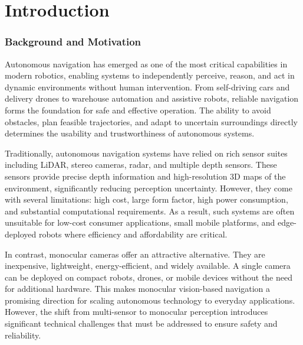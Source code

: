 \documentclass[12pt,oneside]{book}
\makeatletter
\renewcommand{\thefigure}{\Roman{figure}}
\renewcommand{\tablename}{TABLE}
\renewcommand{\thetable}{\Roman{table}}
\renewcommand{\fnum@table}{\tablename~\thetable}
\makeatother
\begin{document}
\renewcommand{\listtablename}{LIST OF TABLES}
\renewcommand{\tablename}{TABLE}
\renewcommand{\thetable}{\Roman{table}}
\makeatletter
\renewcommand{\fnum@table}{\tablename~\thefigure}
\makeatother

\listoftables
\clearpage

\chapter{Introduction}

\let\oldsection\section
\renewcommand{\section}[1]{\oldsection*{#1}}

\subsection{Background and Motivation}
Autonomous navigation has emerged as one of the most critical capabilities in modern robotics, enabling systems to independently perceive, reason, and act in dynamic environments without human intervention. From self-driving cars and delivery drones to warehouse automation and assistive robots, reliable navigation forms the foundation for safe and effective operation. The ability to avoid obstacles, plan feasible trajectories, and adapt to uncertain surroundings directly determines the usability and trustworthiness of autonomous systems.

Traditionally, autonomous navigation systems have relied on rich sensor suites including LiDAR, stereo cameras, radar, and multiple depth sensors. These sensors provide precise depth information and high-resolution 3D maps of the environment, significantly reducing perception uncertainty. However, they come with several limitations: high cost, large form factor, high power consumption, and substantial computational requirements. As a result, such systems are often unsuitable for low-cost consumer applications, small mobile platforms, and edge-deployed robots where efficiency and affordability are critical.

In contrast, monocular cameras offer an attractive alternative. They are inexpensive, lightweight, energy-efficient, and widely available. A single camera can be deployed on compact robots, drones, or mobile devices without the need for additional hardware. This makes monocular vision-based navigation a promising direction for scaling autonomous technology to everyday applications. However, the shift from multi-sensor to monocular perception introduces significant technical challenges that must be addressed to ensure safety and reliability.
\end{document}
